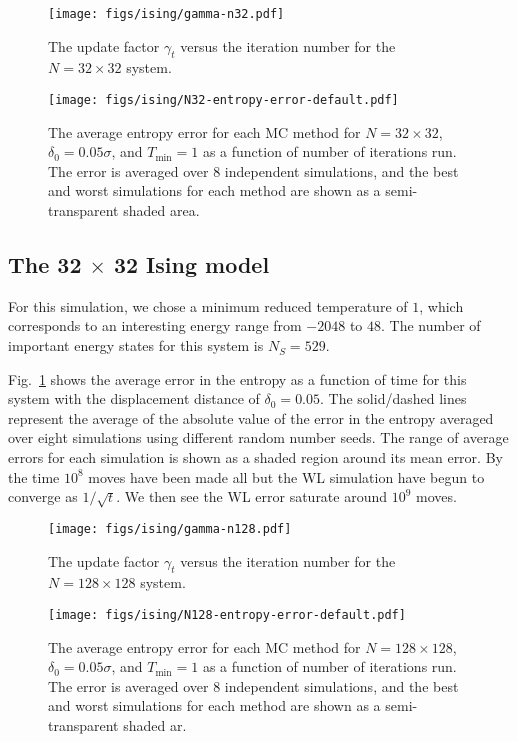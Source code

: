 \documentclass[letterpaper,twocolumn,amsmath,amssymb,pre,aps,10pt]{revtex4-1}
\begin{document}
\begin{figure}
\texttt{[image: figs/ising/gamma-n32.pdf]}
  \caption{
  The update factor $\gamma_t$ versus the iteration number for the $N=32 \times 32$
  system.}
\end{figure}

\begin{figure}
\texttt{[image: figs/ising/N32-entropy-error-default.pdf]}
  \caption{
  The average entropy error for each MC method for $N=32 \times 32$,
               $\delta_0 = 0.05\sigma$, and $T_{\min} = 1$
               as a function of number of iterations run.  The error is
               averaged over 8 independent simulations, and the best
               and worst simulations for each method are shown as a
               semi-transparent shaded area.}\label{fig:n32}
\end{figure}

\subsection{The 32 $\times$ 32 Ising model}
For this simulation, we chose a minimum reduced temperature of $1$, which
corresponds to an interesting energy range from $-2048$ to $48$.  The number of
important energy states for this system is $N_S = 529$.

Fig.~\ref{fig:n32} shows the average error in the entropy as a function of time for
this system with the displacement distance of $\delta_0 = 0.05$. The solid/dashed lines
represent the average of the absolute value of the error in the entropy averaged
over eight simulations using different random number seeds. The range of average
errors for each simulation is shown as a shaded region around its mean error. By
the time $10^8$ moves have been made all but the WL simulation have begun to
converge as $1/\sqrt{t}$. We then see the WL error saturate around $10^9$ moves.

\begin{figure}
\texttt{[image: figs/ising/gamma-n128.pdf]}
  \caption{
  The update factor $\gamma_t$ versus the iteration number for the $N=128 \times 128$
  system.}
\end{figure}

\begin{figure}
\texttt{[image: figs/ising/N128-entropy-error-default.pdf]}
  \caption{
  The average entropy error for each MC method for $N=128 \times 128$,
               $\delta_0 = 0.05\sigma$, and $T_{\min} = 1$
               as a function of number of iterations run.  The error is
               averaged over 8 independent simulations, and the best
               and worst simulations for each method are shown as a
               semi-transparent shaded ar.}\label{fig:n128}
\end{figure}
\end{document}
